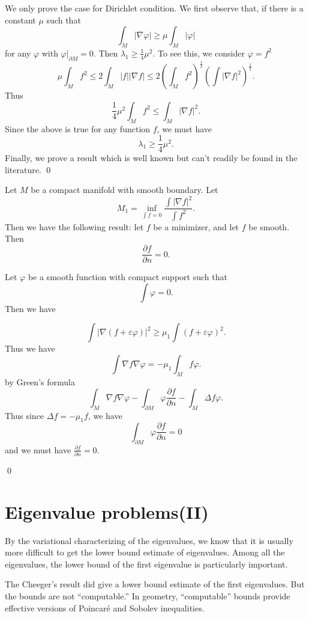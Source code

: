  We only prove the case for Dirichlet condition. We first observe that, if there is a constant $\mu$ such that 
%
\[ \int_M |\nabla \varphi | \geq \mu \int_M |\varphi | \]
%
for any  $ \varphi $ with $ \varphi |_{\partial M} = 0 $. Then $ \lambda _1 \geq \frac{1}{4} \mu^2 $. To 
see this, we consider $ \varphi = f^2 $ 
%
\[ \mu \int _M f^2 \leq 2 \int_M |f| | \nabla f|\leq 2 \left( \int_M f^2 \right) ^{\frac{1}{2}} \left( \int |\nabla f|^2 \right) ^{\frac{1}{2}}.\]
%
Thus
%
\[ \frac{1}{4} \mu^2 \int_M f ^2 \leq \int_M | \nabla f|^2.\]
%
Since the above is true for any function $f$, we must have 
%
\[ \lambda _1 \geq \frac{1}{4} \mu ^2 .\]
%
Finally, we prove a result which is well known but can't readily be found in the literature.
\qed

\begin{theorem} Let $M$ be a compact manifold with smooth boundary. Let 
%
\[ M_1 = \inf_{\int f = 0} \frac{\int | \nabla f|^2}{\int f ^2} .\]
%
Then we have the following result: let $f$ be a minimizer, and let $f$ be smooth. Then
%
\[\frac{\partial f }{\partial n} = 0. \]
\end{theorem}

 Let $ \varphi $ be a smooth function with compact support such that 
%
\[ \int \varphi = 0. \]
%
Then we have 

\[ \int |\nabla (f + \varepsilon \varphi )|^2 \geq \mu_1 \int (f + \varepsilon \varphi )^2 .\]
%
Thus we have
%
\[ \int \nabla f \nabla \varphi = - \mu _1 \int_M f \varphi.\]
%
by Green's formula
%
\[ \int_M \nabla f \nabla \varphi - \int _{\partial M} \varphi \frac{\partial f }{\partial n} - \int_M \Delta f \varphi.\]
%
Thus since $ \Delta f = - \mu_1 f $, we have 
%
\[ \int_{\partial M} \varphi\frac{\partial f }{\partial n}  = 0 \]
%
and we must have $ \frac{\partial f }{\partial n}  = 0 $.

\qed


\section{Eigenvalue problems(II)}\label{Eigenvalue_II}

By the variational characterizing of the eigenvalues, we know that it is usually more difficult to get the lower bound estimate of eigenvalues. Among all the eigenvalues, the lower bound of the first eigenvalue is particularly important.

The Cheeger's result did give a lower bound estimate of the first eigenvalues. But the bounds are not ``computable.'' In geometry, ``computable'' bounds provide effective versions of Poincar\'{e} and Sobolev inequalities.

